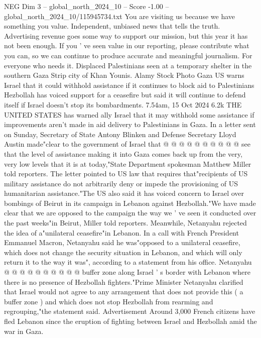 \begin{textsample}{NEG Dim 3 – global\_north\_2024\_10 – Score -1.00 – global\_north\_2024\_10/115945734.txt}  \label{ex:f3_neg_305}
You are visiting us because we have something you value.
Independent, unbiased news that tells the truth.
Advertising revenue goes some way to support our mission, but this year it has not been enough.
If you ' ve seen value in our reporting, please contribute what you can, so we can continue to produce accurate and meaningful journalism.
For everyone who needs it.
Displaced Palestinians seen at a temporary shelter in the southern Gaza Strip city of Khan Younis.
Alamy Stock Photo Gaza US warns Israel that it could withhold assistance if it continues to block aid to Palestinians Hezbollah has voiced support for a ceasefire but said it will continue to defend itself if Israel doesn't stop its bombardments. 7.54am, 15 Oct 2024 6.2k THE UNITED STATES has warned ally Israel that it may withhold some assistance if improvements aren't made in aid delivery to Palestinians in Gaza.
In a letter sent on Sunday, Secretary of State Antony Blinken and Defense Secretary Lloyd Austin made"clear to the government of Israel that @ @ @ @ @ @ @ @ @ @ see that the level of assistance making it into Gaza comes back up from the very, very low levels that it is at today,"State Department spokesman Matthew Miller told reporters.
The letter pointed to US law that requires that"recipients of US military assistance do not arbitrarily deny or impede the provisioning of US humanitarian assistance."The US also said it has voiced concern to Israel over bombings of Beirut in its campaign in Lebanon against Hezbollah."We have made clear that we are opposed to the campaign the way we ' ve seen it conducted over the past weeks"in Beirut, Miller told reporters.
Meanwhile, Netanyahu rejected the idea of a"unilateral ceasefire"in Lebanon.
In a call with French President Emmanuel Macron, Netanyahu said he was"opposed to a unilateral ceasefire, which does not change the security situation in Lebanon, and which will only return it to the way it was", according to a statement from his office.
Netanyahu @ @ @ @ @ @ @ @ @ @ buffer zone along Israel ' s border with Lebanon where there is no presence of Hezbollah fighters."Prime Minister Netanyahu clarified that Israel would not agree to any arrangement that does not provide this ( a buffer zone ) and which does not stop Hezbollah from rearming and regrouping,"the statement said.
Advertisement Around 3,000 French citizens have fled Lebanon since the eruption of fighting between Israel and Hezbollah amid the war in Gaza.

\end{textsample}
